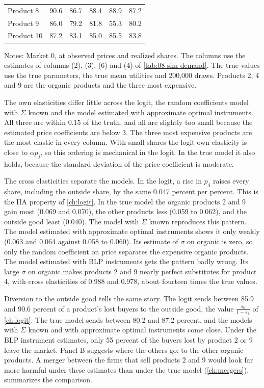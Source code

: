 \begin{table}[htbp]
\begin{tabular}{lccccc}
Product 8 & 90.6 & 86.7 & 88.4 & 88.9 & 87.2 \\
Product 9 & 86.0 & 79.2 & 81.8 & 55.3 & 80.2 \\
Product 10 & 87.2 & 83.1 & 85.0 & 85.5 & 83.8 \\
\bottomrule
\end{tabular}
\par\smallskip
\parbox{\linewidth}{\footnotesize Notes: Market 0, at observed prices and realized shares. The columns use the
estimates of columns (2), (3), (6) and (4) of \cref{tab:08-sim-demand}. The true values use the true parameters, the
true mean utilities and 200,000 draws. Products 2, 4 and 9 are the organic products and the three most expensive.}
\end{table}

The own elasticities differ little across the logit, the random coefficients model with $\Sigma$ known and the model
estimated with approximate optimal instruments. All three are within 0.15 of the truth, and all are slightly too small
because the estimated price coefficients are below 3. The three most expensive products are the most elastic in every
column. With small shares the logit own elasticity is close to $\alpha p_j$, so this ordering is mechanical in the
logit. In the true model it also holds, because the standard deviation of the price coefficient is moderate.

The cross elasticities separate the models. In the logit, a rise in $p_4$ raises every share, including the outside
share, by the same 0.047 percent per percent. This is the IIA property of \cref{ch:logit}. In the true model the
organic products 2 and 9 gain most (0.069 and 0.070), the other products less (0.059 to 0.062), and the outside good
least (0.040). The model with $\Sigma$ known reproduces this pattern. The model estimated with approximate optimal
instruments shows it only weakly (0.063 and 0.064 against 0.058 to 0.060). Its estimate of $\sigma$ on organic is
zero, so only the random coefficient on price separates the expensive organic products. The model estimated with
BLP instruments gets the pattern badly wrong. Its large $\sigma$ on organic makes products 2 and 9 nearly perfect
substitutes for product 4, with cross elasticities of 0.988 and 0.978, about fourteen times the true values.

Diversion to the outside good tells the same story. The logit sends between 85.9 and 90.6 percent of a product's lost
buyers to the outside good, the value $\frac{s_0}{1 - s_k}$ of \cref{ch:logit}. The true model sends between 80.2 and
87.2 percent, and the models with $\Sigma$ known and with approximate optimal instruments come close. Under the BLP
instrument estimates, only 55 percent of the buyers lost by product 2 or 9 leave the market. Panel B suggests where
the others go: to the other organic products. A merger between the firms that sell products 2 and 9 would look far more harmful
under these estimates than under the true model (\cref{ch:mergers}).  summarizes the comparison.

